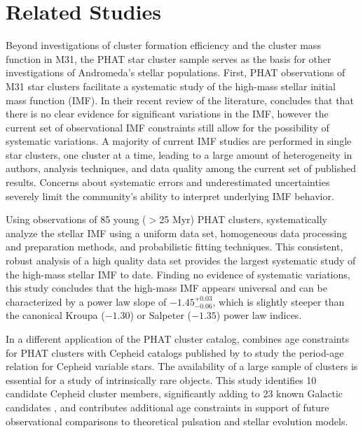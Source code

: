 \section{Related Studies}

Beyond investigations of cluster formation efficiency and the cluster mass function in M31, the PHAT star cluster sample serves as the basis for other investigations of Andromeda's stellar populations.  First, PHAT observations of M31 star clusters facilitate a systematic study of the high-mass stellar initial mass function (IMF).  In their recent review of the literature, \citet{Bastian10} concludes that that there is no clear evidence for significant variations in the IMF, however the current set of observational IMF constraints still allow for the possibility of systematic variations.  A majority of current IMF studies are performed in single star clusters, one cluster at a time, leading to a large amount of heterogeneity in authors, analysis techniques, and data quality among the current set of published results.  Concerns about systematic errors and underestimated uncertainties \citep[see][]{Weisz13} severely limit the community's ability to interpret underlying IMF behavior.

Using observations of 85 young ($>$25 Myr) PHAT clusters, \citet{Weisz15} systematically analyze the stellar IMF using a uniform data set, homogeneous data processing and preparation methods, and probabilistic fitting techniques. This consistent, robust analysis of a high quality data set provides the largest systematic study of the high-mass stellar IMF to date.  Finding no evidence of systematic variations, this study concludes that the high-mass IMF appears universal and can be characterized by a power law slope of $-1.45^{+0.03}_{-0.06}$, which is slightly steeper than the canonical Kroupa ($-1.30$) or Salpeter ($-1.35$) power law indices.

In a different application of the PHAT cluster catalog, \citet{Senchyna15} combines age constraints for PHAT clusters with Cepheid catalogs published by \citet{Kodric13} to study the period-age relation for Cepheid variable stars.  The availability of a large sample of clusters is essential for a study of intrinsically rare objects.  This study identifies 10 candidate Cepheid cluster members, significantly adding to 23 known Galactic candidates \citep{Anderson13}, and contributes additional age constraints in support of future observational comparisons to theoretical pulsation and stellar evolution models.

